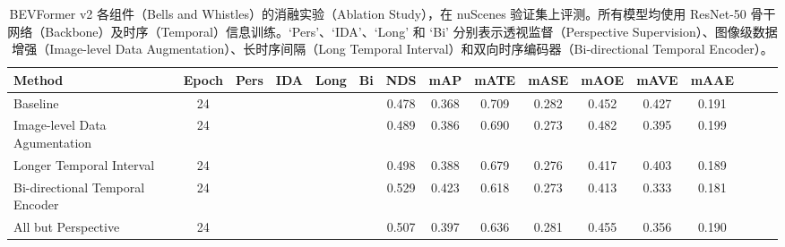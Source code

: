 \let\ck\checkmark

\setlength{\tabcolsep}{3pt}
\setlength{\doublerulesep}{2\arrayrulewidth}
\renewcommand{\arraystretch}{1.0}
\begin{table}[t]
    \caption{BEVFormer v2 各组件（Bells and Whistles）的消融实验（Ablation Study），在 nuScenes 验证集上评测。所有模型均使用 ResNet-50 骨干网络（Backbone）及时序（Temporal）信息训练。`Pers'、`IDA'、`Long' 和 `Bi' 分别表示透视监督（Perspective Supervision）、图像级数据增强（Image-level Data Augmentation）、长时序间隔（Long Temporal Interval）和双向时序编码器（Bi-directional Temporal Encoder）。}
    \label{table:trick}
    \centering
    \vspace{-5pt}
    \begin{tabular}{l|c|cccc|cc|cc|cccccc}
        \toprule
        Method & Epoch & Pers & IDA & Long & Bi & NDS & mAP & mATE & mASE & mAOE & mAVE & mAAE   \\ 
        \midrule
        Baseline & 24 & \ck & & & & 0.478 & 0.368 & 0.709 & 0.282 & 0.452 & 0.427 & 0.191 \\ 
        Image-level Data Agumentation & 24 & \ck & \ck & & & 0.489 & 0.386 & 0.690 & 0.273 & 0.482 & 0.395 & 0.199 \\
        Longer Temporal Interval & 24 & \ck & \ck & \ck & & 0.498 & 0.388 & 0.679 & 0.276 & 0.417 & 0.403 & 0.189 \\
        Bi-directional Temporal Encoder & 24 & \ck & \ck & \ck & \ck & 0.529 & 0.423 & 0.618 & 0.273 & 0.413 & 0.333 & 0.181 \\
        All but Perspective & 24 & & \ck & \ck & \ck & 0.507 & 0.397 & 0.636 & 0.281 & 0.455 & 0.356 & 0.190 \\
        \bottomrule
    \end{tabular}
    
\end{table}